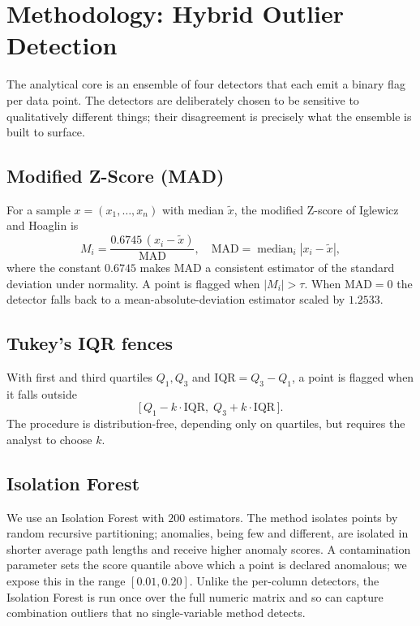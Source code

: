\documentclass[conference]{IEEEtran}
\begin{document}
\section{Methodology: Hybrid Outlier Detection}
The analytical core is an ensemble of four detectors that each emit a binary flag per data point. The detectors are deliberately chosen to be sensitive to qualitatively different things; their disagreement is precisely what the ensemble is built to surface.

\subsection{Modified Z-Score (MAD)}
For a sample $x = (x_1,\dots,x_n)$ with median $\tilde{x}$, the modified Z-score of Iglewicz and Hoaglin \cite{iglewicz1993} is
\begin{equation}
M_i = \frac{0.6745\,(x_i - \tilde{x})}{\mathrm{MAD}}, \quad \mathrm{MAD} = \operatorname{median}_i |x_i - \tilde{x}|,
\end{equation}
where the constant $0.6745$ makes MAD a consistent estimator of the standard deviation under normality. A point is flagged when $|M_i| > \tau$. When $\mathrm{MAD}=0$ the detector falls back to a mean-absolute-deviation estimator scaled by $1.2533$.

\subsection{Tukey's IQR fences}
With first and third quartiles $Q_1, Q_3$ and $\mathrm{IQR}=Q_3-Q_1$, a point is flagged \cite{tukey1977} when it falls outside
\begin{equation}
\big[\,Q_1 - k\cdot\mathrm{IQR},\; Q_3 + k\cdot\mathrm{IQR}\,\big].
\end{equation}
The procedure is distribution-free, depending only on quartiles, but requires the analyst to choose $k$.

\subsection{Isolation Forest}
We use an Isolation Forest \cite{liu2008} with $200$ estimators. The method isolates points by random recursive partitioning; anomalies, being few and different, are isolated in shorter average path lengths and receive higher anomaly scores. A contamination parameter sets the score quantile above which a point is declared anomalous; we expose this in the range $[0.01, 0.20]$. Unlike the per-column detectors, the Isolation Forest is run once over the full numeric matrix and so can capture combination outliers that no single-variable method detects.
\end{document}
